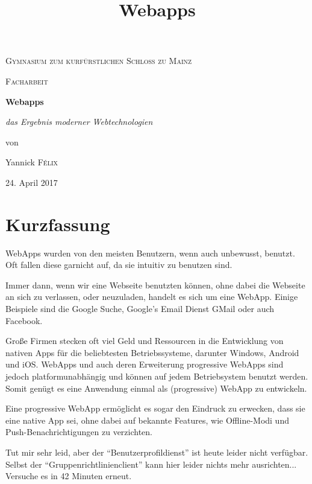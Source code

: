 \documentclass[a4paper,12pt]{scrartcl}      %
\title{Webapps}  %
\begin{document}
	
	\begin{titlepage}
		\centering
		{\scshape\LARGE Gymnasium zum kurf\"{u}rstlichen Schloss zu Mainz \par}
		\vspace{1cm}
		{\scshape\Large Facharbeit\par}
		\vspace{2.5cm}
		{\huge\bfseries Webapps\par}
		\vspace{1cm}
		{\Large\itshape das Ergebnis moderner Webtechnologien\par}
		\vfill
		von\par
		Yannick \textsc{F\'elix}
		
		\vfill
		
		{\large 24. April 2017 \par}
		\newpage
	\end{titlepage}
	
	\setcounter{page}{1}
	\section{Kurzfassung}
	WebApps wurden von den meisten Benutzern, wenn auch unbewusst, benutzt. Oft fallen diese garnicht auf, da sie intuitiv zu benutzen sind.\par
	Immer dann, wenn wir eine Webseite benutzten können, ohne dabei die Webseite an sich zu verlassen, oder neuzuladen, handelt es sich um eine WebApp. Einige Beispiele sind die Google Suche, Google's Email Dienst GMail oder auch Facebook.\par
	Große Firmen stecken oft viel Geld und Ressourcen in die Entwicklung von nativen Apps für die beliebtesten Betriebssysteme, darunter Windows, Android und iOS. WebApps und auch deren Erweiterung progressive WebApps sind jedoch platformunabhängig und können auf jedem Betriebsystem benutzt werden. Somit genügt es eine Anwendung einmal als (progressive) WebApp zu entwickeln.\par
	Eine progressive WebApp ermöglicht es sogar den Eindruck zu erwecken, dass sie eine native App sei, ohne dabei auf bekannte Features, wie Offline-Modi und Push-Benachrichtigungen zu verzichten.\par
	Tut mir sehr leid, aber der ``Benutzerprofildienst'' ist heute leider nicht verfügbar.
	Selbst der ``Gruppenrichtlinienclient'' kann hier leider nichts mehr ausrichten...
	Versuche es in 42 Minuten erneut.\par
\end{document}
